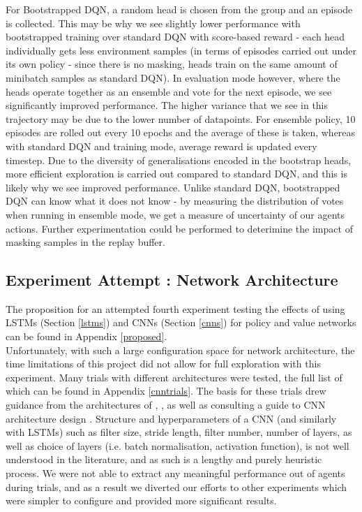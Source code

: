 \documentclass[12pt]{article}
\begin{document}
For Bootstrapped DQN, a random head is chosen from the group and an episode is collected. This may be why we see slightly lower performance with bootstrapped training over standard DQN with score-based reward - each head individually gets less environment samples (in terms of episodes carried out under its own policy - since there is no masking, heads train on the same amount of minibatch samples as standard DQN). In evaluation mode however, where the heads operate together as an ensemble and vote for the next episode, we see significantly improved performance. The higher variance that we see in this trajectory may be due to the lower number of datapoints. For ensemble policy, 10 episodes are rolled out every 10 epochs and the average of these is taken, whereas with standard DQN and training mode, average reward is updated every timestep. Due to the diversity of generalisations encoded in the bootstrap heads, more efficient exploration is carried out compared to standard DQN, and this is likely why we see improved performance. Unlike standard DQN, bootstrapped DQN can know what it does not know - by measuring the distribution of votes when running in ensemble mode, we get a measure of uncertainty of our agents actions. Further experimentation could be performed to deterimine the impact of masking samples in the replay buffer. 
\subsection{Experiment Attempt : Network Architecture}\label{netarch}
The proposition for an attempted fourth experiment testing the effects of using LSTMs (Section \ref{lstms}) and CNNs (Section \ref{cnns}) for policy and value networks can be found in Appendix \ref{proposed}. \\\newline
Unfortunately, with such a large configuration space for network architecture, the time limitations of this project did not allow for full exploration with this experiment. Many trials with different architectures were tested, the full list of which can be found in Appendix \ref{cnntrials}. The basis for these trials drew guidance from the architectures of \textcite{Mnih2015}, \textcite{Silver2017}, as well as consulting a guide to CNN architecture design \autocite{dumoulin2016guide}. Structure and hyperparameters of a CNN (and similarly with LSTMs) such as filter size, stride length, filter number, number of layers, as well as choice of layers (i.e. batch normalisation, activation function), is not well understood in the literature, and as such is a lengthy and purely heuristic process. We were not able to extract any meaningful performance out of agents during trials, and as a result we diverted our efforts to other experiments which were simpler to configure and provided more significant results.
\end{document}
